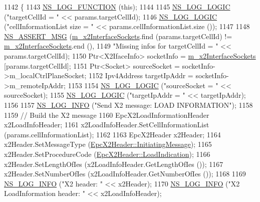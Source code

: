 \begin{DoxyCode}
1142 \{
1143   \hyperlink{log-macros-disabled_8h_a90b90d5bad1f39cb1b64923ea94c0761}{NS\_LOG\_FUNCTION} (\textcolor{keyword}{this});
1144 
1145   \hyperlink{group__logging_ga88acd260151caf2db9c0fc84997f45ce}{NS\_LOG\_LOGIC} (\textcolor{stringliteral}{"targetCellId = "} << params.targetCellId);
1146   \hyperlink{group__logging_ga88acd260151caf2db9c0fc84997f45ce}{NS\_LOG\_LOGIC} (\textcolor{stringliteral}{"cellInformationList size = "} << params.cellInformationList.size ());
1147 
1148   \hyperlink{assert_8h_aff5ece9066c74e681e74999856f08539}{NS\_ASSERT\_MSG} (\hyperlink{classns3_1_1EpcX2_a0665276228b9b99a52ef6d5e9bdb306d}{m\_x2InterfaceSockets}.find (params.targetCellId) != 
      \hyperlink{classns3_1_1EpcX2_a0665276228b9b99a52ef6d5e9bdb306d}{m\_x2InterfaceSockets}.end (),
1149                  \textcolor{stringliteral}{"Missing infos for targetCellId = "} << params.targetCellId);
1150   Ptr<X2IfaceInfo> socketInfo = \hyperlink{classns3_1_1EpcX2_a0665276228b9b99a52ef6d5e9bdb306d}{m\_x2InterfaceSockets} [params.targetCellId];
1151   Ptr<Socket> sourceSocket = socketInfo->m\_localCtrlPlaneSocket;
1152   Ipv4Address targetIpAddr = socketInfo->m\_remoteIpAddr;
1153 
1154   \hyperlink{group__logging_ga88acd260151caf2db9c0fc84997f45ce}{NS\_LOG\_LOGIC} (\textcolor{stringliteral}{"sourceSocket = "} << sourceSocket);
1155   \hyperlink{group__logging_ga88acd260151caf2db9c0fc84997f45ce}{NS\_LOG\_LOGIC} (\textcolor{stringliteral}{"targetIpAddr = "} << targetIpAddr);
1156 
1157   \hyperlink{group__logging_gafbd73ee2cf9f26b319f49086d8e860fb}{NS\_LOG\_INFO} (\textcolor{stringliteral}{"Send X2 message: LOAD INFORMATION"});
1158 
1159   \textcolor{comment}{// Build the X2 message}
1160   EpcX2LoadInformationHeader x2LoadInfoHeader;
1161   x2LoadInfoHeader.SetCellInformationList (params.cellInformationList);
1162 
1163   EpcX2Header x2Header;
1164   x2Header.SetMessageType (\hyperlink{classns3_1_1EpcX2Header_a0e69b043a20eaee4c570f223f4eca715a5761e50c3c1918a44e3a5ebc86f17435}{EpcX2Header::InitiatingMessage});
1165   x2Header.SetProcedureCode (\hyperlink{classns3_1_1EpcX2Header_afd178c1ed3c47948c587955698a15b0dae86cf17c79745d2849a8c1efcec6a64d}{EpcX2Header::LoadIndication});
1166   x2Header.SetLengthOfIes (x2LoadInfoHeader.GetLengthOfIes ());
1167   x2Header.SetNumberOfIes (x2LoadInfoHeader.GetNumberOfIes ());
1168 
1169   \hyperlink{group__logging_gafbd73ee2cf9f26b319f49086d8e860fb}{NS\_LOG\_INFO} (\textcolor{stringliteral}{"X2 header: "} << x2Header);
1170   \hyperlink{group__logging_gafbd73ee2cf9f26b319f49086d8e860fb}{NS\_LOG\_INFO} (\textcolor{stringliteral}{"X2 LoadInformation header: "} << x2LoadInfoHeader);

\end{DoxyCode}
